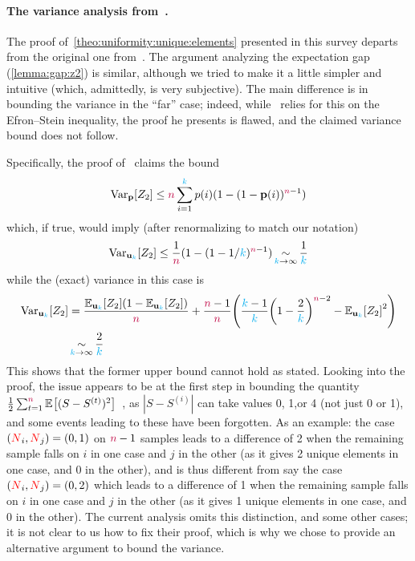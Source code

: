 \bgroup\color{black!50!purple}
\paragraph{The variance analysis from~\citet{Paninski08}.}
The proof of~\cref{theo:uniformity:unique:elements} presented in this survey departs from the original one from~\citet{Paninski08}. The argument analyzing the expectation gap (\cref{lemma:gap:z2}) is similar, although we tried to make it a little simpler and intuitive (which, admittedly, is very subjective). The main difference is in bounding the variance in the ``far'' case; indeed, while~\cite{Paninski08} relies for this on the Efron--Stein inequality, the proof he presents is flawed, and the claimed variance bound does not follow.

Specifically, the proof of~\citet[Lemma~2]{Paninski08} claims the bound
\[
  \operatorname{Var}_{\mathbf{p}}[Z_2] \leq {\textcolor{purple}{n}} \sum_{i=1}^{\textcolor{cyan}{k}} p(i)(1-(1-\mathbf{p}(i))^{{\textcolor{purple}{n}}-1})
\]
which, if true, would imply (after renormalizing to match our notation)
\[
  \operatorname{Var}_{\mathbf{u}_{\textcolor{cyan}{k}}}[Z_2] \leq \frac{1}{{\textcolor{purple}{n}}}(1-(1-1/{\textcolor{cyan}{k}})^{{\textcolor{purple}{n}}-1}) \operatorname*{\sim}_{{\textcolor{cyan}{k}}\to \infty} \frac{1}{{\textcolor{cyan}{k}}}
\]
while the (exact) variance in this case is
\begin{align*}
\Var_{\uniform_\ab}[Z_2]
&= \frac{\bE{\uniform_\ab}{Z_2}(1-\bE{\uniform_\ab}{Z_2})}{\ns} + \frac{\ns-1}{\ns}\Paren{ \frac{\ab-1}{\ab}\Paren{1-\frac{2}{\ab}}^{\ns-2} - \bE{\uniform_\ab}{Z_2}^2} \\
&\operatorname*{\sim}_{\ab\to \infty} \frac{2}{\ab}
\end{align*}
This shows that the former upper bound cannot hold as stated. Looking into the proof, the issue appears to be at the first step in bounding 
the quantity $\frac{1}{2} \sum_{t=1}^\ns \bEE{(S-S^{(t)})^2}$~\cite[p.3, top of right column]{Paninski08}, as $|S-S^{(i)}|$ can take values 0, 1,or 4 (not just 0 or 1), and some events leading to these have been forgotten. As an example: the case $(\textcolor{red}{N}_i,\textcolor{red}{N}_j)=(0,1)$ on ${\textcolor{purple}{n}}-1$ samples leads to a difference of 2 when the remaining sample falls on $i$ in one case and $j$ in the other (as it gives 2 unique elements in one case, and 0 in the other), and is thus different from say the case $(\textcolor{red}{N}_i,\textcolor{red}{N}_j)=(0,2)$ which leads to a difference of 1 when the remaining sample falls on $i$ in one case and $j$ in the other (as it gives 1 unique elements in one case, and 0 in the other). The current analysis omits this distinction, and some other cases; it is not clear to us how to fix their proof, which is why we chose to provide an alternative argument to bound the variance.

